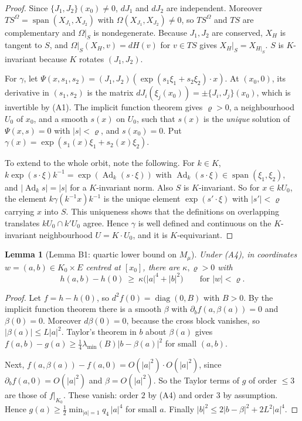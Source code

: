 \documentclass[11pt]{article}
\newtheorem{lemma}[theorem]{Lemma}
\theoremstyle{definition}
\theoremstyle{remark}
\begin{document}
\begin{proof}
Since $\{J_1,J_2\}(x_0)\ne0$, $dJ_1$ and $dJ_2$ are independent. Moreover
$TS^\Omega=\operatorname{span}(X_{J_1},X_{J_2})$ with $\Omega(X_{J_1},X_{J_2})\ne0$, so $TS^\Omega$ and
$TS$ are complementary and $\Omega|_S$ is nondegenerate. Because $J_1,J_2$ are conserved, $X_H$ is tangent
to $S$, and $\Omega|_S(X_H,v)=dH(v)$ for $v\in TS$ gives $X_H|_S=X_{H|_S}$. $S$ is $K$-invariant because
$K$ rotates $(J_1,J_2)$.

For $\gamma$, let $\Psi(x,s_1,s_2)=(J_1,J_2)(\exp(s_1\xi_1+s_2\xi_2)\cdot x)$. At $(x_0,0)$, its derivative
in $(s_1,s_2)$ is the matrix $dJ_i(\xi_j(x_0))=\pm\{J_i,J_j\}(x_0)$, which is invertible by (A1). The
implicit function theorem gives $\varrho>0$, a neighbourhood $U_0$ of $x_0$, and a smooth $s(x)$ on $U_0$,
such that $s(x)$ is the \emph{unique} solution of $\Psi(x,s)=0$ with $|s|<\varrho$, and $s(x_0)=0$. Put
$\gamma(x)=\exp(s_1(x)\xi_1+s_2(x)\xi_2)$.

To extend to the whole orbit, note the following. For $k\in K$,
$k\exp(s\cdot\xi)k^{-1}=\exp(\operatorname{Ad}_k(s\cdot\xi))$ with $\operatorname{Ad}_k(s\cdot\xi)
\in\operatorname{span}(\xi_1,\xi_2)$, and $|\operatorname{Ad}_k s|=|s|$ for a $K$-invariant norm. Also
$S$ is $K$-invariant. So for $x\in kU_0$, the element $k\gamma(k^{-1}x)k^{-1}$ is the unique element
$\exp(s'\cdot\xi)$ with $|s'|<\varrho$ carrying $x$ into $S$. This uniqueness shows that the definitions on
overlapping translates $kU_0\cap k'U_0$ agree. Hence $\gamma$ is well defined and continuous on the
$K$-invariant neighbourhood $U=K\cdot U_0$, and it is $K$-equivariant.
\end{proof}

\begin{lemma}[Lemma B1: quartic lower bound on $M_\mu$]\label{lem:B1}
Under (A4), in coordinates $w=(a,b)\in K_0\times E$ centred at $[x_0]$, there are $\kappa,\varrho>0$ with
\[
h(a,b)-h(0)\ \ge\ \kappa\big(|a|^4+|b|^2\big)\qquad\text{for }|w|<\varrho .
\]
\end{lemma}

\begin{proof}
Let $f=h-h(0)$, so $d^2f(0)=\operatorname{diag}(0,B)$ with $B>0$. By the implicit function theorem there is a
smooth $\beta$ with $\partial_bf(a,\beta(a))=0$ and $\beta(0)=0$. Moreover $d\beta(0)=0$, because the cross
block vanishes, so $|\beta(a)|\le L|a|^2$. Taylor's theorem in $b$ about $\beta(a)$ gives
$f(a,b)-g(a)\ge\tfrac14\lambda_{\min}(B)|b-\beta(a)|^2$ for small $(a,b)$.

Next, $f(a,\beta(a))-f(a,0)=O(|a|^2)\cdot O(|a|^2)$, since $\partial_bf(a,0)=O(|a|^2)$ and $\beta=O(|a|^2)$.
So the Taylor terms of $g$ of order $\le3$ are those of $f|_{K_0}$. These vanish: order $2$ by (A4) and order
$3$ by assumption. Hence $g(a)\ge\tfrac12\min_{|a|=1}q_4\,|a|^4$ for small $a$. Finally
$|b|^2\le2|b-\beta|^2+2L^2|a|^4$.
\end{proof}
\end{document}

